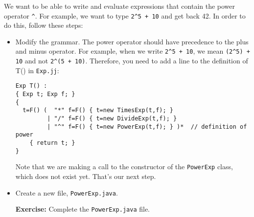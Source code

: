 \documentclass{article}
\begin{document}
We want to be able to write and evaluate expressions that contain the power operator \verb+^+. For example, we want to type \verb?2^5 + 10? and get back 42.
In order to do this, follow these steps:

\begin{itemize}
\item Modify the grammar. The power operator should have precedence to the plus and minus operator. For example, when we write \verb?2^5 + 10?, we mean \verb?(2^5) + 10? and not \verb?2^(5 + 10)?. Therefore, you need to add a line to the definition of T() in {\tt Exp.jj}:

\begin{verbatim}
Exp T() :
{ Exp t; Exp f; }
{
  t=F() (  "*" f=F() { t=new TimesExp(t,f); }
         | "/" f=F() { t=new DivideExp(t,f); } 
         | "^" f=F() { t=new PowerExp(t,f); } )*  // definition of power
    { return t; }
}
\end{verbatim}

Note that we are making a call to the constructor of the {\tt PowerExp} class, which does not exist yet. That's our next step.

\item Create a new file, {\tt PowerExp.java}.

\textbf{Exercise:} Complete the \verb+PowerExp.java+ file.

\end{itemize}
\end{document}
